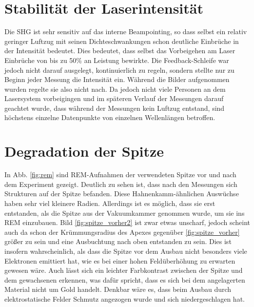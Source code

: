 \documentclass[bachelor,       %
               twoside,        %
               BCOR10mm,       %
               english,ngerman, %
               final,          %
               ]{GAUBM}
\begin{document}
\section{Stabilität der Laserintensität}
Die SHG ist sehr sensitiv auf das interne Beampointing, so dass selbst ein relativ geringer Luftzug mit seinen Dichteschwankungen schon deutliche Einbrüche in der Intensität bedeutet.
Dies bedeutet, dass selbst das Vorbeigehen am Laser Einbrüche von bis zu 50\% an Leistung bewirkte.
Die Feedback-Schleife war jedoch nicht darauf ausgelegt, kontinuierlich zu regeln, sondern stellte nur zu Beginn jeder Messung die Intensität ein.
Während die Bilder aufgenommen wurden regelte sie also nicht nach.
Da jedoch nicht viele Personen an dem Lasersystem vorbeigingen und im späteren Verlauf der Messungen darauf geachtet wurde, dass während der Messungen kein Luftzug entstand, sind höchstens einzelne Datenpunkte von einzelnen Wellenlängen betroffen.


\section{Degradation der Spitze}
In Abb. \ref{fig:rem} sind REM-Aufnahmen der verwendeten Spitze vor und nach dem Experiment gezeigt.
Deutlich zu sehen ist, dass nach den Messungen sich Strukturen auf der Spitze befanden.
Diese Hahnenkamm-ähnlichen Auswüchse haben sehr viel kleinere Radien.
Allerdings ist es möglich, dass sie erst entstanden, als die Spitze aus der Vakuumkammer genommen wurde, um sie ins REM einzubauen.
Bild \ref{fig:spitze_vorher2} ist zwar etwas unscharf, jedoch scheint auch da schon der Krümmungsradius des Apexes gegenüber \ref{fig:spitze_vorher} größer zu sein und eine Ausbuchtung nach oben entstanden zu sein.
Dies ist insofern wahrscheinlich, als dass die Spitze vor dem Ausbau nicht besonders viele Elektronen emittiert hat, wie es bei einer hohen Feldüberhöhung zu erwarten gewesen wäre.
Auch lässt sich ein leichter Farbkontrast zwischen der Spitze und dem gewachsenen erkennen, was dafür spricht, dass es sich bei dem angelagerten Material nicht um Gold handelt.
Denkbar wäre es, dass beim Ausbau durch elektrostatische Felder Schmutz angezogen wurde und sich niedergeschlagen hat.
\end{document}
